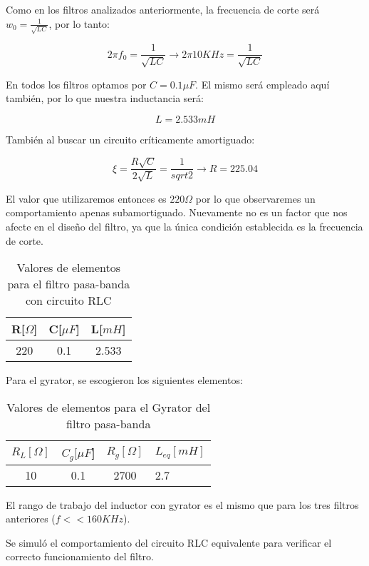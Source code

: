 Como en los filtros analizados anteriormente, la frecuencia de corte
será $w_0=\frac{1}{\sqrt{LC}}$, por lo tanto:

$$2 \pi f_0 = \frac{1}{\sqrt{LC}} \longrightarrow 2 \pi 10KHz = \frac{1}{\sqrt{LC}}$$

En todos los filtros optamos por $C=0.1 \mu F$. El mismo será empleado aquí también, por lo que nuestra inductancia será:

$$L = 2.533 mH$$

También al buscar un circuito críticamente amortiguado:

$$\xi=\frac{R \sqrt{C}}{2\sqrt{L}}=\frac{1}{sqrt{2}} \longrightarrow R=225.04$$

El valor que utilizaremos entonces es $220 \Omega$ por lo que observaremes un comportamiento apenas subamortiguado.
Nuevamente no es un factor que nos afecte en el diseño del filtro, ya que la única condición establecida es la frecuencia
de corte.

\begin{table}[H]
    \centering
    \begin{tabular}{|c|c|c|}
    \hline
    \rowcolor[HTML]{C0C0C0} 
    R[$\Omega$] & C[$\mu F$] & L[$mH$]  \\ \hline
    220     & 0.1  & 2.533 \\ \hline
    \end{tabular}
    \caption{Valores de elementos para el filtro pasa-banda con circuito RLC}
    \end{table}

Para el gyrator, se escogieron los siguientes elementos:

\begin{table}[H]
    \centering
    \begin{tabular}{|c|c|c|l|}
    \hline
    \rowcolor[HTML]{C0C0C0} 
    $R_L[\Omega]$ & $C_g[\mu F$] & $R_g[\Omega]$  & $L_{eq}[mH]$ \\ \hline
    10      & 0.1  & 2700 & 2.7        \\ \hline
    \end{tabular}
    \caption{Valores de elementos para el Gyrator del filtro pasa-banda}
    \end{table}

El rango de trabajo del inductor con gyrator es el mismo que para los tres filtros anteriores ($ f << 160 KHz$).

Se simuló el comportamiento del circuito RLC equivalente para verificar el correcto funcionamiento del filtro.

